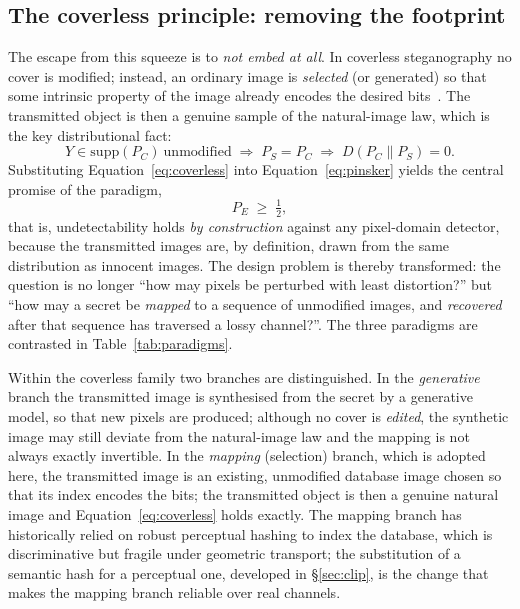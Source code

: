 \documentclass[11pt]{article}
\theoremstyle{definition}
\newcommand{\Eqn}[1]{Equation~\eqref{#1}}
\newcommand{\Tab}[1]{Table~\ref{#1}}
\begin{document}
\subsection{The coverless principle: removing the footprint}\label{sec:coverless}
The escape from this squeeze is to \emph{not embed at all}. In coverless
steganography no cover is modified; instead, an ordinary image is
\emph{selected} (or generated) so that some intrinsic property of the image already
encodes the desired bits~\cite{zhou2015,coverlessSurvey2024}. The transmitted
object is then a genuine sample of the natural-image law, which is the key
distributional fact:
\begin{equation}
  Y\in\mathrm{supp}(P_C)\ \text{unmodified}
  \;\Longrightarrow\; P_S=P_C
  \;\Longrightarrow\; D\!\left(P_C\|P_S\right)=0 .
  \label{eq:coverless}
\end{equation}
Substituting \Eqn{eq:coverless} into \Eqn{eq:pinsker} yields the central promise of
the paradigm,
\begin{equation}
  P_E \;\ge\; \tfrac{1}{2},
  \label{eq:chance}
\end{equation}
that is, undetectability holds \emph{by construction} against any pixel-domain
detector, because the transmitted images are, by definition, drawn from the same
distribution as innocent images. The design problem is thereby transformed: the
question is no longer ``how may pixels be perturbed with least distortion?'' but
``how may a secret be \emph{mapped} to a sequence of unmodified images, and
\emph{recovered} after that sequence has traversed a lossy channel?''. The
three paradigms are contrasted in \Tab{tab:paradigms}.

Within the coverless family two branches are distinguished. In the
\emph{generative} branch the transmitted image is synthesised from the secret by a
generative model, so that new pixels are produced; although no cover is
\emph{edited}, the synthetic image may still deviate from the natural-image law and
the mapping is not always exactly invertible. In the \emph{mapping} (selection)
branch, which is adopted here, the transmitted image is an existing, unmodified
database image chosen so that its index encodes the bits; the transmitted object is
then a genuine natural image and \Eqn{eq:coverless} holds exactly. The mapping
branch has historically relied on robust perceptual hashing to index the database,
which is discriminative but fragile under geometric transport; the substitution of
a semantic hash for a perceptual one, developed in \S\ref{sec:clip}, is the change
that makes the mapping branch reliable over real channels.
\end{document}
